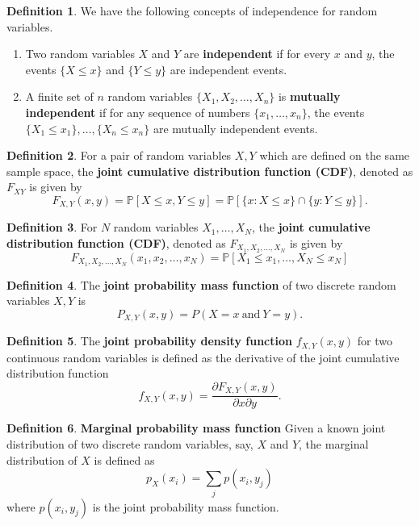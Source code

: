 \documentclass[11pt,a4paper]{amsart}
\theoremstyle{plain}
\theoremstyle{definition}
\newtheorem{definition}{Definition}
\begin{document}
	\begin{definition}\label{d: inde of random variables}
		We have the following concepts of independence for random variables.
		\begin{enumerate}
			\item Two random variables $X$ and $Y$ are  \textbf{independent} if for every $x$ and $y$, the events $\{X \leq x\}$ and $\{Y \leq y\}$ are independent events.
			\item A finite set of $n$ random variables $\{X_{1}, X_{2}, \dots, X_{n}\}$ is  \textbf{mutually independent} if for any sequence of numbers $\{x_{1}, \dots, x_{n}\}$, the events $\{X_{1} \leq x_{1}\}, \dots, \{X_{n} \leq x_{n}\}$ are mutually independent events.
		\end{enumerate}
	\end{definition}

	\begin{definition}
		For a pair of random variables $X, Y$ which are defined on the same sample space, the \textbf{joint cumulative distribution function (CDF)}, denoted as $F_{XY}$ is given by
		\[	F_{X,Y}(x,y) = \mathbb{P}[X \leq x, Y \leq y] = \mathbb{P}[\{x \colon X \leq x\} \cap  \{y \colon Y \leq y\}].	\]
	\end{definition}

	\begin{definition}
		For $N$ random variables $X_{1}, \dots, X_{N}$, the \textbf{joint cumulative distribution function (CDF)}, denoted as $F_{X_{1}, X_{2}, \dots, X_{N}}$ is given by
		\[	F_{X_{1}, X_{2}, \dots, X_{N}}(x_{1}, x_{2}, \dots, x_{N}) = \mathbb{P}[X_{1} \leq x_{1}, \dots, X_{N} \leq x_{N} ]	\]
	\end{definition}

	\begin{definition}
		The \textbf{joint probability mass function} of two discrete random variables $X, Y$ is 
	\[	P_{X,Y}(x,y) = P(X = x ~\text{and}~ Y = y).	\]
	\end{definition}

	\begin{definition}
		The \textbf{joint probability density function} $f_{X,Y}(x,y)$ for two continuous random variables is defined as the derivative of the joint cumulative distribution function
		\[	f_{X,Y}(x,y) = \frac{\partial F_{X,Y}(x,y)}{\partial x \partial y}.	\]
	\end{definition}

	\begin{definition}
		\textbf{Marginal probability mass function} Given a known joint distribution of two discrete random variables, say, $X$ and $Y$, the marginal distribution of $X$ is defined as 
		\[	p_{X}(x_{i}) = \sum_{j} p(x_{i}, y_{j})	\]
		where $p(x_{i}, y_{j})$ is the joint probability mass function.
	\end{definition}
\end{document}
